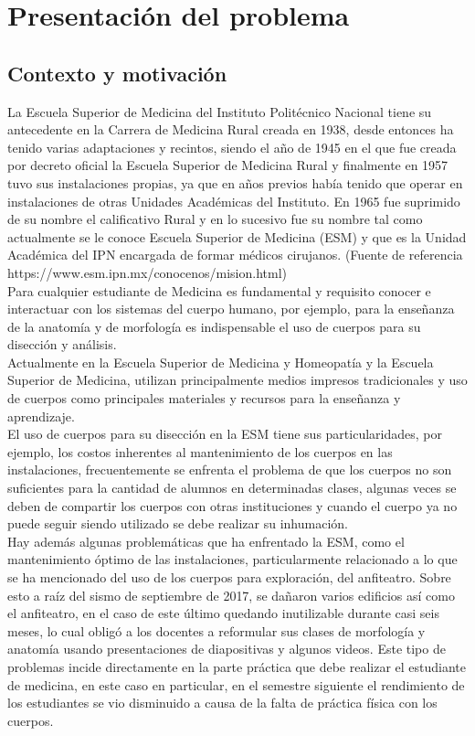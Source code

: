 \chapter{Presentación del problema}

\section{Contexto y motivación}
La Escuela Superior de Medicina del Instituto Politécnico Nacional tiene su antecedente en la Carrera de Medicina Rural creada en 1938, desde entonces ha tenido varias adaptaciones y recintos, siendo el año de 1945 en el que fue creada por decreto oficial la Escuela Superior de Medicina Rural y finalmente en 1957 tuvo sus instalaciones propias, ya que en años previos había tenido que operar en instalaciones de otras Unidades Académicas del Instituto. En 1965 fue suprimido de su nombre el calificativo Rural y en lo sucesivo fue su nombre tal como actualmente se le conoce Escuela Superior de Medicina (ESM) y que es la Unidad Académica del IPN encargada de formar médicos cirujanos. (Fuente de referencia https://www.esm.ipn.mx/conocenos/mision.html)\\
Para cualquier estudiante de Medicina es fundamental y requisito conocer e interactuar con los sistemas del cuerpo humano, por ejemplo,  para la enseñanza de la anatomía y de morfología es indispensable el uso de cuerpos para su disección y análisis.\\
Actualmente en la Escuela Superior de Medicina y Homeopatía y la Escuela Superior de Medicina, utilizan principalmente medios impresos tradicionales y uso de cuerpos como principales materiales y recursos para  la enseñanza y aprendizaje.\\
El uso de cuerpos para su disección en la ESM tiene sus particularidades, por ejemplo, los costos inherentes al mantenimiento de los cuerpos en las instalaciones, frecuentemente se enfrenta el problema de que los cuerpos no son suficientes para la cantidad de alumnos en determinadas clases, algunas veces se deben de compartir los cuerpos con otras instituciones y cuando el cuerpo ya no puede seguir siendo utilizado se debe realizar su inhumación.\\
Hay además algunas problemáticas que ha enfrentado la ESM, como el mantenimiento óptimo de las instalaciones, particularmente relacionado a lo que se ha mencionado del uso de los cuerpos para exploración, del anfiteatro. Sobre esto a raíz del sismo de septiembre de 2017, se dañaron varios edificios así como el anfiteatro, en el caso de este último quedando inutilizable durante casi seis meses, lo cual obligó  a los docentes a reformular sus clases de morfología y anatomía usando presentaciones de diapositivas y algunos videos. Este tipo de problemas incide directamente en la parte práctica que debe realizar el estudiante de medicina, en este caso en particular, en el semestre siguiente el rendimiento de los estudiantes se vio disminuido a causa de la falta de práctica física con los cuerpos.\\
